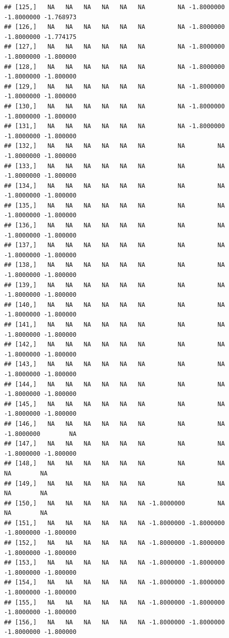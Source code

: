 \documentclass{article}\usepackage[]{graphicx}\usepackage[]{color}
\makeatletter
\newenvironment{kframe}{%
 \def\at@end@of@kframe{}%
 \ifinner\ifhmode%
  \def\at@end@of@kframe{\end{minipage}}%
  \begin{minipage}{\columnwidth}%
 \fi\fi%
 \def\FrameCommand##1{\hskip\@totalleftmargin \hskip-\fboxsep
 \colorbox{shadecolor}{##1}\hskip-\fboxsep
     \hskip-\linewidth \hskip-\@totalleftmargin \hskip\columnwidth}%
 \MakeFramed {\advance\hsize-\width
   \@totalleftmargin\z@ \linewidth\hsize
   \@setminipage}}%
 {\par\unskip\endMakeFramed%
 \at@end@of@kframe}
\newenvironment{knitrout}{}{} %
\makeatother
\begin{document}
\begin{knitrout}
\begin{kframe}
\begin{verbatim}
## [125,]   NA   NA   NA   NA   NA   NA         NA -1.8000000 -1.8000000 -1.768973
## [126,]   NA   NA   NA   NA   NA   NA         NA -1.8000000 -1.8000000 -1.774175
## [127,]   NA   NA   NA   NA   NA   NA         NA -1.8000000 -1.8000000 -1.800000
## [128,]   NA   NA   NA   NA   NA   NA         NA -1.8000000 -1.8000000 -1.800000
## [129,]   NA   NA   NA   NA   NA   NA         NA -1.8000000 -1.8000000 -1.800000
## [130,]   NA   NA   NA   NA   NA   NA         NA -1.8000000 -1.8000000 -1.800000
## [131,]   NA   NA   NA   NA   NA   NA         NA -1.8000000 -1.8000000 -1.800000
## [132,]   NA   NA   NA   NA   NA   NA         NA         NA -1.8000000 -1.800000
## [133,]   NA   NA   NA   NA   NA   NA         NA         NA -1.8000000 -1.800000
## [134,]   NA   NA   NA   NA   NA   NA         NA         NA -1.8000000 -1.800000
## [135,]   NA   NA   NA   NA   NA   NA         NA         NA -1.8000000 -1.800000
## [136,]   NA   NA   NA   NA   NA   NA         NA         NA -1.8000000 -1.800000
## [137,]   NA   NA   NA   NA   NA   NA         NA         NA -1.8000000 -1.800000
## [138,]   NA   NA   NA   NA   NA   NA         NA         NA -1.8000000 -1.800000
## [139,]   NA   NA   NA   NA   NA   NA         NA         NA -1.8000000 -1.800000
## [140,]   NA   NA   NA   NA   NA   NA         NA         NA -1.8000000 -1.800000
## [141,]   NA   NA   NA   NA   NA   NA         NA         NA -1.8000000 -1.800000
## [142,]   NA   NA   NA   NA   NA   NA         NA         NA -1.8000000 -1.800000
## [143,]   NA   NA   NA   NA   NA   NA         NA         NA -1.8000000 -1.800000
## [144,]   NA   NA   NA   NA   NA   NA         NA         NA -1.8000000 -1.800000
## [145,]   NA   NA   NA   NA   NA   NA         NA         NA -1.8000000 -1.800000
## [146,]   NA   NA   NA   NA   NA   NA         NA         NA -1.8000000        NA
## [147,]   NA   NA   NA   NA   NA   NA         NA         NA -1.8000000 -1.800000
## [148,]   NA   NA   NA   NA   NA   NA         NA         NA         NA        NA
## [149,]   NA   NA   NA   NA   NA   NA         NA         NA         NA        NA
## [150,]   NA   NA   NA   NA   NA   NA -1.8000000         NA         NA        NA
## [151,]   NA   NA   NA   NA   NA   NA -1.8000000 -1.8000000 -1.8000000 -1.800000
## [152,]   NA   NA   NA   NA   NA   NA -1.8000000 -1.8000000 -1.8000000 -1.800000
## [153,]   NA   NA   NA   NA   NA   NA -1.8000000 -1.8000000 -1.8000000 -1.800000
## [154,]   NA   NA   NA   NA   NA   NA -1.8000000 -1.8000000 -1.8000000 -1.800000
## [155,]   NA   NA   NA   NA   NA   NA -1.8000000 -1.8000000 -1.8000000 -1.800000
## [156,]   NA   NA   NA   NA   NA   NA -1.8000000 -1.8000000 -1.8000000 -1.800000

\end{verbatim}
\end{kframe}
\end{knitrout}
\end{document}
